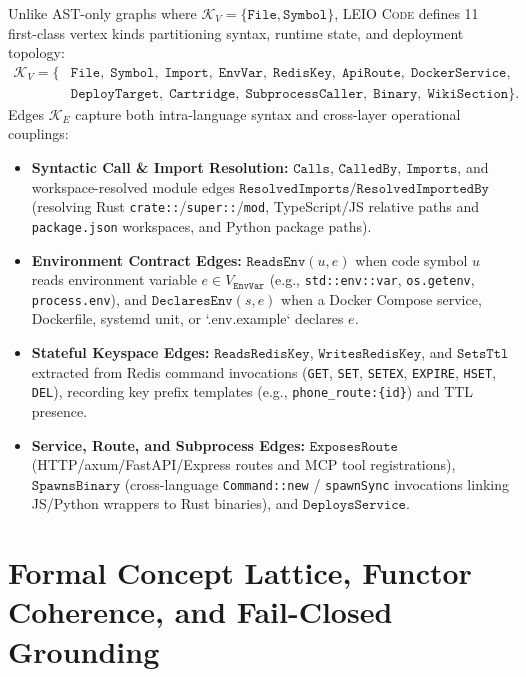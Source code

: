 \documentclass[11pt]{article}
\begin{document}
Unlike AST-only graphs where $\mathcal{K}_V = \{\texttt{File}, \texttt{Symbol}\}$, \textsc{LEIO Code} defines 11 first-class vertex kinds partitioning syntax, runtime state, and deployment topology:
\begin{align*}
\mathcal{K}_V = \{&\texttt{File},\; \texttt{Symbol},\; \texttt{Import},\; \texttt{EnvVar},\; \texttt{RedisKey},\; \texttt{ApiRoute},\; \texttt{DockerService}, \\
&\texttt{DeployTarget},\; \texttt{Cartridge},\; \texttt{SubprocessCaller},\; \texttt{Binary},\; \texttt{WikiSection}\}.
\end{align*}
Edges $\mathcal{K}_E$ capture both intra-language syntax and cross-layer operational couplings:
\begin{itemize}
    \item \textbf{Syntactic Call \& Import Resolution:} $\texttt{Calls}$, $\texttt{CalledBy}$, $\texttt{Imports}$, and workspace-resolved module edges $\texttt{ResolvedImports} / \texttt{ResolvedImportedBy}$ (resolving Rust \texttt{crate::}/\texttt{super::}/\texttt{mod}, TypeScript/JS relative paths and \texttt{package.json} workspaces, and Python package paths).
    \item \textbf{Environment Contract Edges:} $\texttt{ReadsEnv}(u, e)$ when code symbol $u$ reads environment variable $e \in V_{\texttt{EnvVar}}$ (e.g., \texttt{std::env::var}, \texttt{os.getenv}, \texttt{process.env}), and $\texttt{DeclaresEnv}(s, e)$ when a Docker Compose service, Dockerfile, systemd unit, or `.env.example` declares $e$.
    \item \textbf{Stateful Keyspace Edges:} $\texttt{ReadsRedisKey}$, $\texttt{WritesRedisKey}$, and $\texttt{SetsTtl}$ extracted from Redis command invocations (\texttt{GET}, \texttt{SET}, \texttt{SETEX}, \texttt{EXPIRE}, \texttt{HSET}, \texttt{DEL}), recording key prefix templates (e.g., \texttt{phone\_route:\{id\}}) and TTL presence.
    \item \textbf{Service, Route, and Subprocess Edges:} $\texttt{ExposesRoute}$ (HTTP/axum/FastAPI/Express routes and MCP tool registrations), $\texttt{SpawnsBinary}$ (cross-language \texttt{Command::new} / \texttt{spawnSync} invocations linking JS/Python wrappers to Rust binaries), and $\texttt{DeploysService}$.
\end{itemize}

\section{Formal Concept Lattice, Functor Coherence, and Fail-Closed Grounding}
\label{sec:fca}
\end{document}
